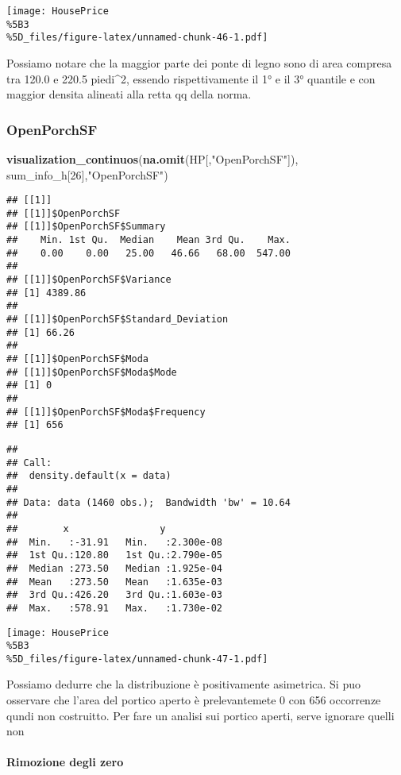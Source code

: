 \documentclass[
]{article}
\newenvironment{Shaded}{\begin{snugshade}}{\end{snugshade}}
\newcommand{\DecValTok}[1]{\textcolor[rgb]{0.00,0.00,0.81}{#1}}
\newcommand{\FunctionTok}[1]{\textcolor[rgb]{0.13,0.29,0.53}{\textbf{#1}}}
\newcommand{\NormalTok}[1]{#1}
\newcommand{\StringTok}[1]{\textcolor[rgb]{0.31,0.60,0.02}{#1}}
\begin{document}
\texttt{[image: HousePrice\\\%5B3\\\%5D\_files/figure-latex/unnamed-chunk-46-1.pdf]}

Possiamo notare che la maggior parte dei ponte di legno sono di area
compresa tra 120.0 e 220.5 piedi\^{}2, essendo rispettivamente il 1° e
il 3° quantile e con maggior densita alineati alla retta qq della norma.

\subsubsection{OpenPorchSF}\label{openporchsf}

\begin{Shaded}
\begin{Highlighting}[]
\FunctionTok{visualization\_continuos}\NormalTok{(}\FunctionTok{na.omit}\NormalTok{(HP[,}\StringTok{"OpenPorchSF"}\NormalTok{]), sum\_info\_h[}\DecValTok{26}\NormalTok{],}\StringTok{"OpenPorchSF"}\NormalTok{)}
\end{Highlighting}
\end{Shaded}

\begin{verbatim}
## [[1]]
## [[1]]$OpenPorchSF
## [[1]]$OpenPorchSF$Summary
##    Min. 1st Qu.  Median    Mean 3rd Qu.    Max. 
##    0.00    0.00   25.00   46.66   68.00  547.00 
## 
## [[1]]$OpenPorchSF$Variance
## [1] 4389.86
## 
## [[1]]$OpenPorchSF$Standard_Deviation
## [1] 66.26
## 
## [[1]]$OpenPorchSF$Moda
## [[1]]$OpenPorchSF$Moda$Mode
## [1] 0
## 
## [[1]]$OpenPorchSF$Moda$Frequency
## [1] 656
\end{verbatim}

\begin{verbatim}
## 
## Call:
##  density.default(x = data)
## 
## Data: data (1460 obs.);  Bandwidth 'bw' = 10.64
## 
##        x                y            
##  Min.   :-31.91   Min.   :2.300e-08  
##  1st Qu.:120.80   1st Qu.:2.790e-05  
##  Median :273.50   Median :1.925e-04  
##  Mean   :273.50   Mean   :1.635e-03  
##  3rd Qu.:426.20   3rd Qu.:1.603e-03  
##  Max.   :578.91   Max.   :1.730e-02
\end{verbatim}

\texttt{[image: HousePrice\\\%5B3\\\%5D\_files/figure-latex/unnamed-chunk-47-1.pdf]}

Possiamo dedurre che la distribuzione è positivamente asimetrica. Si puo
osservare che l'area del portico aperto è prelevantemete 0 con 656
occorrenze qundi non costruitto. Per fare un analisi sui portico aperti,
serve ignorare quelli non

\paragraph{Rimozione degli zero}\label{rimozione-degli-zero-9}
\end{document}
